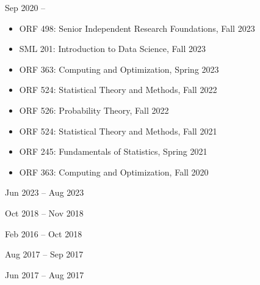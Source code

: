 \documentclass[
  date,
  number,
]{wgu-cv}
\begin{document}
\vspace*{-4mm}


{}
{Sep 2020 --}

\begin{itemize}

  \item
    ORF 498:
    Senior Independent Research Foundations,
    Fall 2023

  \item
    SML 201:
    Introduction to Data Science,
    Fall 2023

  \item
    ORF 363:
    Computing and Optimization,
    Spring 2023

  \item
    ORF 524:
    Statistical Theory and Methods,
    Fall 2022

  \item
    ORF 526:
    Probability Theory,
    Fall 2022

  \item
    ORF 524:
    Statistical Theory and Methods,
    Fall 2021

  \item
    ORF 245:
    Fundamentals of Statistics,
    Spring 2021

  \item
    ORF 363:
    Computing and Optimization,
    Fall 2020

\end{itemize}

{}
{Jun 2023 -- Aug 2023}
\vspace*{2mm}

{}
{Oct 2018 -- Nov 2018}
\vspace*{2mm}

{}
{Feb 2016 -- Oct 2018}
\vspace*{2mm}

{}
{Aug 2017 -- Sep 2017}
\vspace*{2mm}

{}
{Jun 2017 -- Aug 2017}

\end{document}
